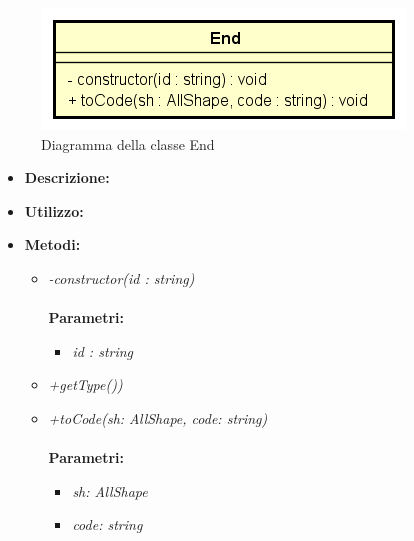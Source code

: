 \begin{figure}[h!]
	\centering
	\includegraphics[scale=0.8]{res/sections/SpecificaFrontEnd/Services/Disegnetti/end.png}
	\caption{Diagramma della classe End}
\end{figure}

\begin{itemize}
	\item \textbf{Descrizione:}\\
	
	\item \textbf{Utilizzo:}\\
	
	\item \textbf{Metodi:}
		\begin{itemize}
			\item \emph{-constructor(id : string)}\\
    		\\
    		\textbf{Parametri:}
    		\begin{itemize}
    			\item \emph{id : string}\\
    			
    		\end{itemize}
			\item \emph{+getType())}\\
    		
			\item \emph{+toCode(sh: AllShape, code: string)}\\
    		\\
    		\textbf{Parametri:}
    		\begin{itemize}
    			\item \emph{sh: AllShape}\\
    			
    			\item \emph{code: string}\\
    			
    		\end{itemize}
    	\end{itemize}
\end{itemize}